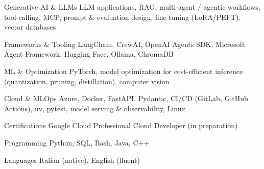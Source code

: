 
\begin{cvskills}

\cvskill
{Generative AI \& LLMs}
{LLM applications, RAG, multi-agent / agentic workflows, tool-calling, MCP, prompt \& evaluation design, fine-tuning (LoRA/PEFT), vector databases}

\cvskill
{Frameworks \& Tooling}
{LangChain, CrewAI, OpenAI Agents SDK, Microsoft Agent Framework, Hugging Face, Ollama, ChromaDB}

\cvskill
{ML \& Optimization}
{PyTorch, model optimization for cost-efficient inference (quantization, pruning, distillation), computer vision}

\cvskill
{Cloud \& MLOps}
{Azure, Docker, FastAPI, Pydantic, CI/CD (GitLab, GitHub Actions), uv, pytest, model serving \& observability, Linux}

\cvskill
{Certifications}
{Google Cloud Professional Cloud Developer (in preparation)}

\cvskill
{Programming}
{Python, SQL, Bash, Java, C++}

\cvskill
{Languages}
{Italian (native), English (fluent)}

\end{cvskills}
